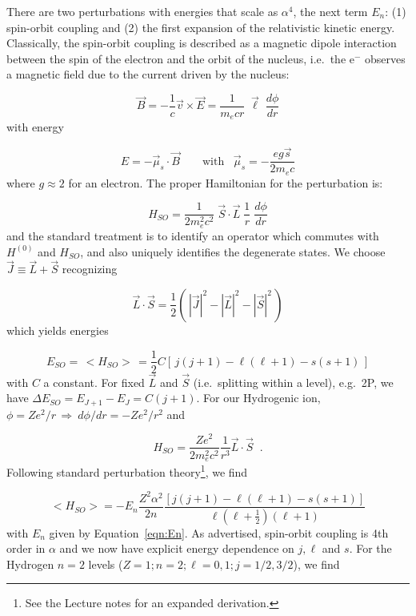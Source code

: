\documentclass[graybox]{svmult}
\def\ohf{\frac{1}{2}}
\def\ltk{\left [ \,}
\def\ltp{\left ( \,}
\def\rtk{\, \right  ] }
\def\rtp{\, \right  ) }
\def\imp{\, \Rightarrow \>}
\begin{document}
There are two perturbations with energies that scale
as $\alpha^4$, the next term $E_n$:
(1) spin-orbit coupling and
(2) the first expansion of the relativistic kinetic energy.
Classically, the spin-orbit coupling is described as 
a magnetic dipole interaction between the spin of the electron
and the orbit of the nucleus, i.e.\ 
the e$^{-}$ observes a magnetic field due
to the current driven by the nucleus:

\begin{equation}
\vec B = - \frac{1}{c} \vec v \times \vec 
E = \frac{1}{m_e c r} \; \vec \ell \;
\frac{d\phi}{dr}
\end{equation}
with energy

\begin{equation}
E = - \vec \mu_s \cdot \vec B  \quad\quad \text{with} \;\;\; 
\vec \mu_s = -\frac{e g \vec s}{2 m_e c}
\end{equation}
where $g \approx 2$ for an electron.
The proper Hamiltonian for the perturbation is:

\begin{equation}
H_{SO} = \frac{1}{2 m_e^2 c^2} \; \vec S \cdot \vec L \; \frac{1}{r} \;
\frac{d\phi}{dr}
\end{equation}
and the standard treatment is to 
identify an operator which commutes with 
$H^{(0)}$ and $H_{SO}$, and also
uniquely identifies the degenerate states.
We choose  $\vec J \equiv \vec L + \vec S$
recognizing

\begin{equation*}
\vec L \cdot \vec S = \ohf \ltp |\vec J|^2 - |\vec L|^2 - |\vec S|^2 \rtp
\end{equation*}
which yields energies

\begin{equation}
E_{SO} = \, <H_{SO}> \, = \ohf C \ltk j(j+1) - \ell(\ell+1) - s(s+1) \rtk
\end{equation}
with $C$ a constant.
For fixed $\vec L$ and $\vec S$ (i.e.\ splitting within a level), 
e.g.\ 2P, we have $\Delta E_{SO} = E_{J+1} - E_J = C (j+1)$.
For our Hydrogenic ion,
$\phi = Z e^2/r \imp d \phi/dr = -Z e^2/r^2$ and

\begin{equation}
H_{SO} = \frac{Z e^2}{2 m_e^2 c^2} \frac{1}{r^3} \vec L \cdot \vec S  \;\; .
\end{equation}
Following standard perturbation 
theory\footnote{See the Lecture notes for an expanded derivation.},
we find

\begin{equation}
<H_{SO}> = -E_n \frac{Z^2 \alpha^2}{2n} \frac{[j(j+1) - 
\ell(\ell+1) - s(s+1)]}{\ell(\ell+\ohf)(\ell+1)}
\end{equation}
with $E_n$ given by Equation~\ref{eqn:En}.
As advertised, spin-orbit coupling is 4th order in $\alpha$
and we now have explicit energy dependence on $j,\ell$ and $s$.
For the Hydrogen $n=2$ levels ($Z=1; n=2; \ell = 0,1; j= 1/2, 3/2$),
we find
\end{document}
